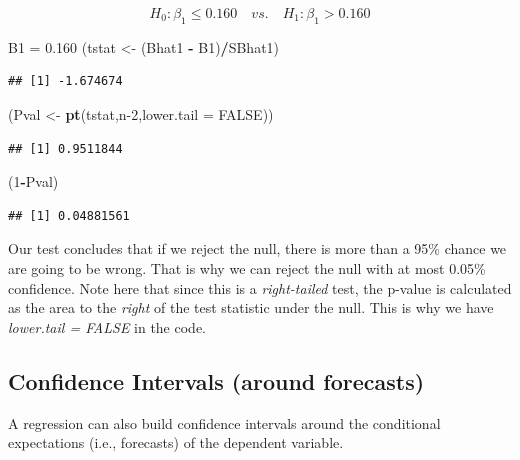 \documentclass[
]{book}
\newenvironment{Shaded}{\begin{snugshade}}{\end{snugshade}}
\newcommand{\AttributeTok}[1]{\textcolor[rgb]{0.13,0.29,0.53}{#1}}
\newcommand{\ConstantTok}[1]{\textcolor[rgb]{0.56,0.35,0.01}{#1}}
\newcommand{\DecValTok}[1]{\textcolor[rgb]{0.00,0.00,0.81}{#1}}
\newcommand{\FloatTok}[1]{\textcolor[rgb]{0.00,0.00,0.81}{#1}}
\newcommand{\FunctionTok}[1]{\textcolor[rgb]{0.13,0.29,0.53}{\textbf{#1}}}
\newcommand{\NormalTok}[1]{#1}
\newcommand{\OtherTok}[1]{\textcolor[rgb]{0.56,0.35,0.01}{#1}}
\newcommand{\SpecialCharTok}[1]{\textcolor[rgb]{0.81,0.36,0.00}{\textbf{#1}}}
\begin{document}
\[H_0:\beta_1\leq0.160 \quad vs. \quad H_1:\beta_1>0.160\]

\begin{Shaded}
\begin{Highlighting}[]
\NormalTok{B1 }\OtherTok{=} \FloatTok{0.160}
\NormalTok{(tstat }\OtherTok{\textless{}{-}}\NormalTok{ (Bhat1 }\SpecialCharTok{{-}}\NormalTok{ B1)}\SpecialCharTok{/}\NormalTok{SBhat1)}
\end{Highlighting}
\end{Shaded}

\begin{verbatim}
## [1] -1.674674
\end{verbatim}

\begin{Shaded}
\begin{Highlighting}[]
\NormalTok{(Pval }\OtherTok{\textless{}{-}} \FunctionTok{pt}\NormalTok{(tstat,n}\DecValTok{{-}2}\NormalTok{,}\AttributeTok{lower.tail =} \ConstantTok{FALSE}\NormalTok{))}
\end{Highlighting}
\end{Shaded}

\begin{verbatim}
## [1] 0.9511844
\end{verbatim}

\begin{Shaded}
\begin{Highlighting}[]
\NormalTok{(}\DecValTok{1}\SpecialCharTok{{-}}\NormalTok{Pval)}
\end{Highlighting}
\end{Shaded}

\begin{verbatim}
## [1] 0.04881561
\end{verbatim}

Our test concludes that if we reject the null, there is more than a 95\% chance we are going to be wrong. That is why we can reject the null with at most 0.05\% confidence. Note here that since this is a \emph{right-tailed} test, the p-value is calculated as the area to the \emph{right} of the test statistic under the null. This is why we have \emph{lower.tail = FALSE} in the code.

\subsection{Confidence Intervals (around forecasts)}\label{confidence-intervals-around-forecasts}

A regression can also build confidence intervals around the conditional expectations (i.e., forecasts) of the dependent variable.
\end{document}
